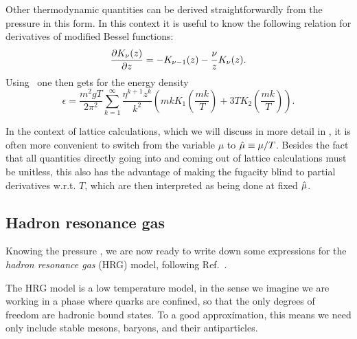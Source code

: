 Other thermodynamic quantities can be derived straightforwardly
from the pressure in this form. In this context it is useful to know
the following relation for derivatives of modified Bessel functions:
\begin{equation}
  \pdv{K_\nu(z)}{z}=-K_{\nu-1}(z)-\frac{\nu}{z}K_\nu(z).
\end{equation}
Using~ one then gets for the energy density
\begin{equation}\label{eq:edensityQM}
  \epsilon=\frac{m^2gT}{2\pi^2}\sum_{k=1}^\infty\frac{\eta^{k+1}z^k}{k^2}
              \left( mk K_1\left(\frac{mk}{T}\right) 
                    + 3TK_2\left(\frac{mk}{T}\right) \right).
\end{equation}

In the context of lattice calculations, which we will discuss in more
detail in , it is often more convenient to switch
from the variable $\mu$ to $\hat{\mu}\equiv\mu/T$. Besides the fact that
all quantities directly going into and coming out of lattice calculations
must be unitless, this also has the advantage of making the
fugacity blind to partial derivatives w.r.t. $T$, which are then 
interpreted as being done at fixed $\hat{\mu}$.

\subsection{Hadron resonance gas}\label{sec:HRG}

Knowing the pressure , we are now ready to write down
some expressions for the {\it hadron resonance gas} (HRG) model,
following Ref.~\cite{karsch_probing_2011}.

The HRG model is a low temperature model, in the sense we imagine we are working
in a phase where quarks are confined, so that the only degrees of freedom are
hadronic bound states. To a good approximation, this means we need only include
stable mesons, baryons, and their antiparticles.



